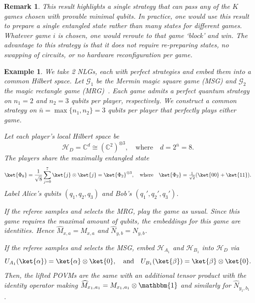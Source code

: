 \documentclass{article}
\newtheorem{remark}{Remark}
\newtheorem{example}{Example}
\begin{document}
    \begin{remark}
        This result highlights a single strategy that can pass any of the $K$ games chosen with provable minimal qubits. In practice, one would use this result to prepare a single entangled state rather than many states for different games. Whatever game $i$ is chosen, one would reroute to that game `block' and win. The advantage to this strategy is that it does not require re-preparing states, no swapping of circuits, or no hardware reconfiguration per game.
    \end{remark}

    \begin{example}
        We take 2 NLGs, each with perfect strategies and embed them into a common Hilbert space. Let $\mathcal G_1$ be the Mermin magic square game (MSG) and $\mathcal G_2$ the magic rectangle game (MRG)~\cite{Mermin1990b}. Each game admits a perfect quantum strategy on $n_1=2$ and $n_2=3$ qubits per player, respectively. We construct a common strategy on $\bar n=\max\{n_1,n_2\}=3$ qubits per player that perfectly plays either game.

        Let each player's local Hilbert space be
        \begin{equation}
            \mathcal H_D = \mathbb C^d \cong (\mathbb C^2)^{\otimes 3}, \quad\text{where}\quad d = 2^{\bar n}=8.
        \end{equation}
        The players share the maximally entangled state
        \begin{equation}
            \ket{\Phi_8}
                = \frac{1}{\sqrt{8}} \sum_{j=0}^7 \ket{j}\otimes\ket{j}
                = \ket{\Phi_2}^{\otimes 3},\quad\text{where}\quad
                \ket{\Phi_2} = \tfrac{1}{\sqrt2}(\ket{00}+\ket{11}).
        \end{equation}
        Label Alice’s qubits $(q_1,q_2,q_3)$ and Bob’s $(q_1',q_2',q_3')$.
    
        If the referee samples and selects the MRG, play the game as usual. Since this game requires the maximal amount of qubits, the embeddings for this game are identities. Hence $\widehat{M}_{x,a}=M_{x,a}$ and $\widehat{N}_{y,b}=N_{y,b}$.
    
        If the referee samples and selects the MSG, embed $\mathcal H_{A_1}$ and $\mathcal H_{B_1}$ into $\mathcal H_D$ via
        \begin{equation}
            U_{A_1}(\ket{\alpha})=\ket{\alpha}\otimes\ket{0},
            \quad\text{and}\quad
            U_{B_1}(\ket{\beta})=\ket{\beta}\otimes\ket{0}.
        \end{equation}
        Then, the lifted POVMs are the same with an additional tensor product with the identity operator making $\widehat{M}_{x_1,a_1} = M_{x_1,a_1}\otimes \mathbbm{1}$ and similarly for $\widehat{N}_{y_1,b_1}$. 
    \end{example}
\end{document}

